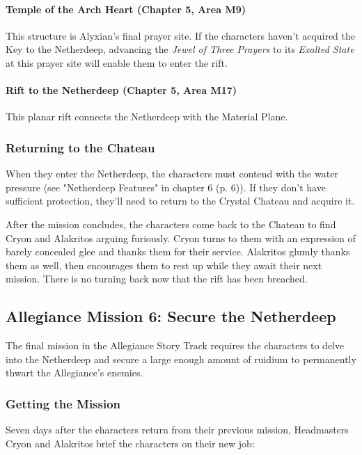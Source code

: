 \documentclass[letterpaper, 11pt, bg=full, twocolumn]{dndbook}
\begin{document}
\paragraph{Temple of the Arch Heart (Chapter 5, Area M9)}

This structure is Alyxian's final prayer site. If the characters haven't acquired the Key to the Netherdeep, advancing the \textit{Jewel of Three Prayers} to its \textit{Exalted State} at this prayer site will enable them to enter the rift.

\paragraph{Rift to the Netherdeep (Chapter 5, Area M17)}

This planar rift connects the Netherdeep with the Material Plane.

\subsubsection{Returning to the Chateau}

When they enter the Netherdeep, the characters must contend with the water pressure (see "Netherdeep Features" in chapter 6 (p. 6)). If they don't have sufficient protection, they'll need to return to the Crystal Chateau and acquire it.

After the mission concludes, the characters come back to the Chateau to find Cryon and Alakritos arguing furiously. Cryon turns to them with an expression of barely concealed glee and thanks them for their service. Alakritos glumly thanks them as well, then encourages them to rest up while they await their next mission. There is no turning back now that the rift has been breached.

\subsection{Allegiance Mission 6: Secure the Netherdeep}

The final mission in the Allegiance Story Track requires the characters to delve into the Netherdeep and secure a large enough amount of ruidium to permanently thwart the Allegiance's enemies.

\subsubsection{Getting the Mission}

Seven days after the characters return from their previous mission, Headmasters Cryon and Alakritos brief the characters on their new job:
\end{document}
